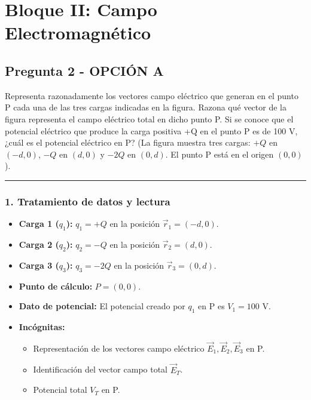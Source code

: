 \newpage

\section{Bloque II: Campo Electromagnético}
\label{sec:em_2025_jul_ord}
\subsection{Pregunta 2 - OPCIÓN A}
\label{subsec:2A_2025_jul_ord}

\begin{cajaenunciado}
Representa razonadamente los vectores campo eléctrico que generan en el punto P cada una de las tres cargas indicadas en la figura. Razona qué vector de la figura representa el campo eléctrico total en dicho punto P. Si se conoce que el potencial eléctrico que produce la carga positiva +Q en el punto P es de 100 V, ¿cuál es el potencial eléctrico en P?
(La figura muestra tres cargas: $+Q$ en $(-d,0)$, $-Q$ en $(d,0)$ y $-2Q$ en $(0,d)$. El punto P está en el origen $(0,0)$).
\end{cajaenunciado}
\hrule

\subsubsection*{1. Tratamiento de datos y lectura}
\begin{itemize}
    \setlength{\itemsep}{0pt}
    \setlength{\parskip}{0pt}
    \item \textbf{Carga 1 ($q_1$):} $q_1 = +Q$ en la posición $\vec{r}_1 = (-d, 0)$.
    \item \textbf{Carga 2 ($q_2$):} $q_2 = -Q$ en la posición $\vec{r}_2 = (d, 0)$.
    \item \textbf{Carga 3 ($q_3$):} $q_3 = -2Q$ en la posición $\vec{r}_3 = (0, d)$.
    \item \textbf{Punto de cálculo:} $P = (0, 0)$.
    \item \textbf{Dato de potencial:} El potencial creado por $q_1$ en P es $V_1 = 100 \text{ V}$.
    \item \textbf{Incógnitas:}
    \begin{itemize}
        \setlength{\itemsep}{0pt}
        \item Representación de los vectores campo eléctrico $\vec{E}_1, \vec{E}_2, \vec{E}_3$ en P.
        \item Identificación del vector campo total $\vec{E}_T$.
        \item Potencial total $V_T$ en P.
    \end{itemize}
\end{itemize}

